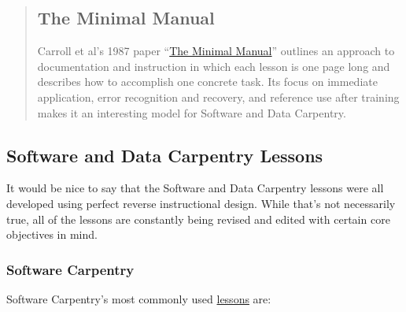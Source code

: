 \begin{quotation}   %
\subsection*{The Minimal Manual}

Carroll et al's 1987 paper ``\href{\{\{ page.root \}\}/files/papers/carroll-minimal-manual-1987.pdf}{The Minimal Manual}''
outlines an approach to documentation and instruction
in which each lesson is one page long and describes how to accomplish one concrete task.
Its focus on immediate application,
error recognition and recovery,
and reference use after training
makes it an interesting model for Software and Data Carpentry.
\end{quotation}   %

\subsection*{Software and Data Carpentry Lessons}

It would be nice to say that the Software and Data Carpentry lessons were all 
developed using perfect reverse instructional design.  While that's not necessarily 
true, all of the lessons are constantly being revised and edited with certain 
core objectives in mind.

\subsubsection*{Software Carpentry}

Software Carpentry's most commonly used \href{\{\{ site.swc\_site \}\}/lessons/}{lessons} are:

